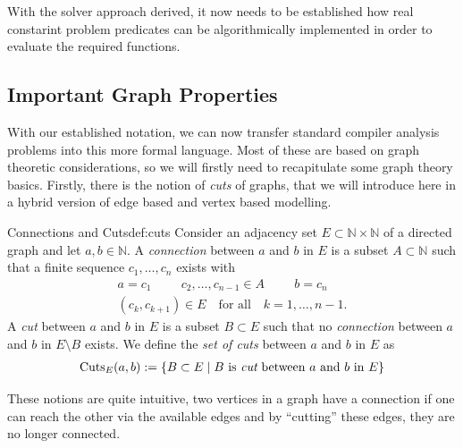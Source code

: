     With the solver approach derived, it now needs to be established how real
    constarint problem predicates can be algorithmically implemented in order
    to evaluate the required functions.

\subsection{Important Graph Properties}

    With our established notation, we can now transfer standard compiler
    analysis problems into this more formal language.
    Most of these are based on graph theoretic considerations, so we
    will firstly need to recapitulate some graph theory basics.
    Firstly, there is the notion of {\em cuts} of graphs, that we will introduce
    here in a hybrid version of edge based and vertex based modelling.

    \begin{definition}{Connections and Cuts}{def:cuts}
        Consider an adjacency set $E\subset\mathbb{N}\times\mathbb{N}$ of a
        directed graph and let $a,b\in\mathbb{N}$.
        \newline
        A {\em connection} between $a$ and $b$ in $E$ is a subset
        $A\subset\mathbb{N}$ such that a finite sequence $c_1,\dots,c_n$
        exists with
        \begin{gather*}
            a=c_1\hspace{1cm}c_2,\dots,c_{n-1}\in A\hspace{1cm}b=c_n\\
            (c_k,c_{k+1})\in E\hspace{1em}\text{for all}\hspace{1em}k=1,\dots,n-1.
        \end{gather*}
        A {\em cut} between $a$ and $b$ in $E$ is a subset $B\subset E$
        such that no {\em connection} between $a$ and $b$ in $E\setminus B$
        exists.
        We define the {\em set of cuts} between $a$ and $b$ in $E$ as
        \begin{align*}
            \text{Cuts}_E(a,b):=\{B\subset E\mid B\text{ is {\em cut} between $a$ and $b$ in $E$}\}
        \end{align*}
    \end{definition}

    These notions are quite intuitive, two vertices in a graph have a connection
    if one can reach the other via the available edges and by ``cutting'' these
    edges, they are no longer connected.

